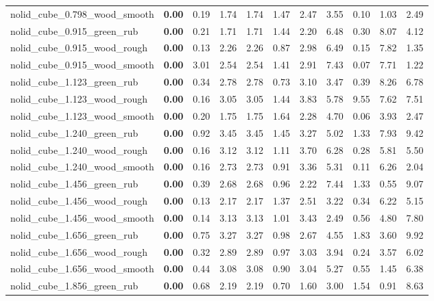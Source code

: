 \begin{table}[H]
{\begin{tabular}{l cccccccccc}
        nolid\_cube\_0.798\_wood\_smooth & \textbf{0.00} & 0.19 & 1.74 & 1.74 & 1.47 & 2.47 & 3.55 & 0.10 & 1.03 & 2.49 \\
        nolid\_cube\_0.915\_green\_rub & \textbf{0.00} & 0.21 & 1.71 & 1.71 & 1.44 & 2.20 & 6.48 & 0.30 & 8.07 & 4.12 \\
        nolid\_cube\_0.915\_wood\_rough & \textbf{0.00} & 0.13 & 2.26 & 2.26 & 0.87 & 2.98 & 6.49 & 0.15 & 7.82 & 1.35 \\
        nolid\_cube\_0.915\_wood\_smooth & \textbf{0.00} & 3.01 & 2.54 & 2.54 & 1.41 & 2.91 & 7.43 & 0.07 & 7.71 & 1.22 \\
        nolid\_cube\_1.123\_green\_rub & \textbf{0.00} & 0.34 & 2.78 & 2.78 & 0.73 & 3.10 & 3.47 & 0.39 & 8.26 & 6.78 \\
        nolid\_cube\_1.123\_wood\_rough & \textbf{0.00} & 0.16 & 3.05 & 3.05 & 1.44 & 3.83 & 5.78 & 9.55 & 7.62 & 7.51 \\
        nolid\_cube\_1.123\_wood\_smooth & \textbf{0.00} & 0.20 & 1.75 & 1.75 & 1.64 & 2.28 & 4.70 & 0.06 & 3.93 & 2.47 \\
        nolid\_cube\_1.240\_green\_rub & \textbf{0.00} & 0.92 & 3.45 & 3.45 & 1.45 & 3.27 & 5.02 & 1.33 & 7.93 & 9.42 \\
        nolid\_cube\_1.240\_wood\_rough & \textbf{0.00} & 0.16 & 3.12 & 3.12 & 1.11 & 3.70 & 6.28 & 0.28 & 5.81 & 5.50 \\
        nolid\_cube\_1.240\_wood\_smooth & \textbf{0.00} & 0.16 & 2.73 & 2.73 & 0.91 & 3.36 & 5.31 & 0.11 & 6.26 & 2.04 \\
        nolid\_cube\_1.456\_green\_rub & \textbf{0.00} & 0.39 & 2.68 & 2.68 & 0.96 & 2.22 & 7.44 & 1.33 & 0.55 & 9.07 \\
        nolid\_cube\_1.456\_wood\_rough & \textbf{0.00} & 0.13 & 2.17 & 2.17 & 1.37 & 2.51 & 3.22 & 0.34 & 6.22 & 5.15 \\
        nolid\_cube\_1.456\_wood\_smooth & \textbf{0.00} & 0.14 & 3.13 & 3.13 & 1.01 & 3.43 & 2.49 & 0.56 & 4.80 & 7.80 \\
        nolid\_cube\_1.656\_green\_rub & \textbf{0.00} & 0.75 & 3.27 & 3.27 & 0.98 & 2.67 & 4.55 & 1.83 & 3.60 & 9.92 \\
        nolid\_cube\_1.656\_wood\_rough & \textbf{0.00} & 0.32 & 2.89 & 2.89 & 0.97 & 3.03 & 3.94 & 0.24 & 3.57 & 6.02 \\
        nolid\_cube\_1.656\_wood\_smooth & \textbf{0.00} & 0.44 & 3.08 & 3.08 & 0.90 & 3.04 & 5.27 & 0.55 & 1.45 & 6.38 \\
        nolid\_cube\_1.856\_green\_rub & \textbf{0.00} & 0.68 & 2.19 & 2.19 & 0.70 & 1.60 & 3.00 & 1.54 & 0.91 & 8.63 \\

\end{tabular}}
\end{table}
